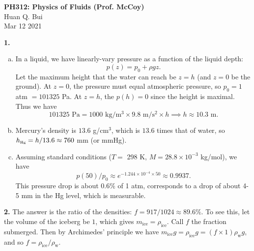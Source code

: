 \documentclass[11pt]{article}
\begin{document}
\begin{center}
{\large \bf PH312: Physics of Fluids (Prof. McCoy)}\\
{ Huan Q. Bui}\\
Mar 12 2021
\end{center}

\noindent \textbf{1.} 
\begin{enumerate}[(a)]
	\item In a liquid, we have linearly-vary pressure as a function of the liquid depth: 
	\begin{equation*}
	p(z) = p_0 + \rho g z.
	\end{equation*}
	Let the maximum height that the water can reach be $z=h$ (and $z=0$ be the ground).  At $z=0$, the pressure must equal atmospheric pressure, so $p_0 = 1$ atm $ = 101325$ Pa. At $z=h$, the $p(h) = 0$ since the height is maximal. Thus we have
	\begin{equation*}
	101325 \mbox{ Pa} = 1000 \mbox{ kg/m$^3$} \times 9.8 \mbox{ m/s$^2$} \times h \implies h \approx 10.3 \mbox{ m}.
	\end{equation*}
	
	\item Mercury's density is $13.6$ g/cm$^3$, which is $13.6$ times that of water, so $h_{\mbox{\tiny{Hg}}} = h/13.6 \approx 760$ mm (or mmHg).
	
	\item Assuming standard conditions ($T = $ 298 K, $M = 28.8\times 10^{-3}$ kg/mol), we have
	\begin{equation*}
	p(50)/p_0 \approx e^{-1.244 \times 10^{-4} \times 50} \approx 0.9937.
	\end{equation*}
	This pressure drop is about $0.6\%$ of 1 atm, corresponds to a drop of about 4-5 mm in the Hg level, which is measurable. 
\end{enumerate}


\noindent \textbf{2.} The answer is the ratio of the densities: $f = 917/1024 \approx 89.6\%$. To see this, let the volume of the iceberg be $1$, which gives $m_\text{ice} = \rho_\text{ice}$. Call $f$ the fraction submerged. Then by Archimedes' principle we have $m_\text{ice} g = \rho_\text{ice} g = (f\times 1)\rho_\text{w}g$, and so $f = \rho_\text{ice}/\rho_\text{w}$. \\
\end{document}

